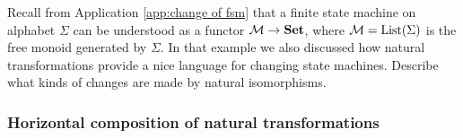 \begin{exercise}
Recall from Application \ref{app:change of fsm} that a finite state machine on alphabet $\Sigma$ can be understood as a functor $\mathcal{M}\rightarrow{\bf Set}$, where $\mathcal{M}=\textnormal{List}(\Sigma)$ is the free monoid generated by $\Sigma$. In that example we also discussed how natural transformations provide a nice language for changing state machines. Describe what kinds of changes are made by natural isomorphisms.
\end{exercise}


\subsubsection{Horizontal composition of natural transformations}

